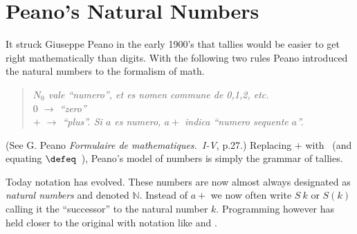 \section{Peano's Natural Numbers}
It struck Giuseppe Peano in the early 1900's that tallies would be easier to get
right mathematically than digits. With the following two rules Peano introduced
the natural numbers to the formalism of math.
\begin{quote}
    \textit{
    $N_0$ vale ``numero'', et es nomen commune de 0,1,2, etc.\\
    $0$ $\to$  ``zero''\\
    $+$ $\to$ ``plus''.  Si $a$ es numero, $a+$ indica ``numero sequente $a$''.
    }
\end{quote}
(See G. Peano \emph{Formulaire de mathematiques.~I-V}, p.27.)
Replacing $+$ with \StrokeOne ~(and equating \StrokeFive$\defeq$\StrokeFour~\StrokeOne),
Peano's model of numbers is simply the grammar of tallies.

Today notation has evolved.  These numbers are now almost always designated as
\emph{natural numbers} and denoted $\mathbb{N}$.  Instead of $a+$ we now often
write $S~k$  or $S(k)$ calling it the ``successor'' to the natural number $k$.  
Programming however has held closer to the original with notation like 
 and .

